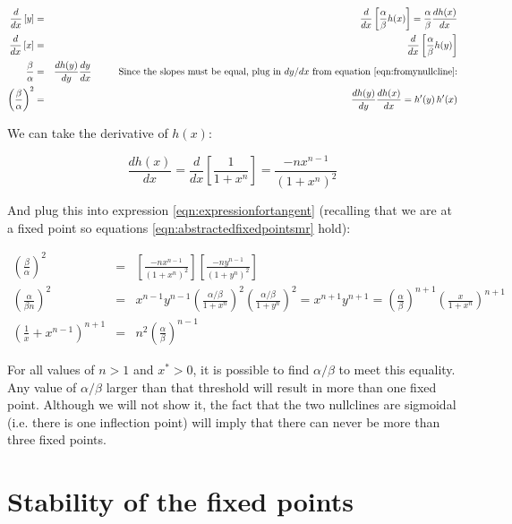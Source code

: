 \documentclass{article}
\begin{document}
\begin{eqnarray}
\frac{d}{dx} \left[ y \right] & = & \frac{d}{dx} \left[ \frac{\alpha}{\beta} h(x) \right] = \frac{\alpha}{\beta} \frac{dh(x)}{dx} \label{eqn:fromynullcline}\\
\frac{d}{dx} \left[ x \right] & = & \frac{d}{dx} \left[ \frac{\alpha}{\beta} h(y) \right] \nonumber \\
\frac{\beta}{\alpha}  & = & \frac{dh(y)}{dy} \frac{dy}{dx} \hspace{1 cm} \textrm{Since the slopes must be equal, plug in $dy/dx$ from equation \ref{eqn:fromynullcline}:} \nonumber\\
\left( \frac{\beta}{\alpha} \right)^2& = & \frac{dh(y)}{dy} \frac{dh(x)}{dx} = h'(y) \, h'(x) \label{eqn:expressionfortangent}
\end{eqnarray}

We can take the derivative of $h(x)$:

\[ \frac{dh(x)}{dx} = \frac{d}{dx} \left[ \frac{1 }{1 + x^n} \right] = \frac{- n x^{n-1}}{\left( 1 + x^n \right)^2}  \]

And plug this into expression \ref{eqn:expressionfortangent} (recalling that we are at a fixed point so equations \ref{eqn:abstractedfixedpointsmr} hold):

\begin{eqnarray*}
\left( \frac{\beta}{\alpha} \right)^2& = & \left[ \frac{- n   x^{n-1}}{\left( 1 + x^n \right)^2} \right] \left[ \frac{- n y^{n-1}}{\left( 1 + y^n \right)^2} \right]\\
\left( \frac{\alpha}{\beta n} \right)^2& = & x^{n-1} y^{n-1} 
\left( \frac{\alpha/\beta}{ 1 + x^n} \right)^2 \left( \frac{\alpha/\beta}{1 + y^n} \right)^2 = x^{n+1} y^{n+1} = \left( \frac{\alpha}{\beta} \right)^{n+1} \left( \frac{x}{1+x^n} \right)^{n+1}\\
\left( \frac{1}{x} + x^{n-1} \right)^{n+1} & = & n^2 \left( \frac{\alpha}{\beta} \right)^{n-1}
\end{eqnarray*}

For all values of $n>1$ and $x^*>0$, it is possible to find $\alpha/\beta$ to meet this equality. Any value of $\alpha/\beta$ larger than that threshold will result in more than one fixed point. Although we will not show it, the fact that the two nullclines are sigmoidal (i.e. there is one inflection point) will imply that there can never be more than three fixed points.

\section*{Stability of the fixed points}
\end{document}
